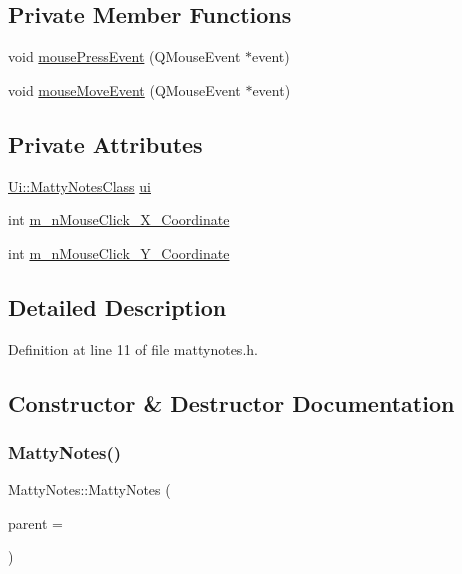 \subsection*{Private Member Functions}
\begin{DoxyCompactItemize}
\item 
void \hyperlink{classMattyNotes_a4818a8cc2dbd824bc005034cb2656198}{mouse\+Press\+Event} (Q\+Mouse\+Event $\ast$event)
\item 
void \hyperlink{classMattyNotes_a0b9d1b50929a097d705e211b57fb12d0}{mouse\+Move\+Event} (Q\+Mouse\+Event $\ast$event)
\end{DoxyCompactItemize}
\subsection*{Private Attributes}
\begin{DoxyCompactItemize}
\item 
\hyperlink{classUi_1_1MattyNotesClass}{Ui\+::\+Matty\+Notes\+Class} \hyperlink{classMattyNotes_aa697392317715f04e4bc011090bebdb5}{ui}
\item 
int \hyperlink{classMattyNotes_a9c2352149386cb95946e3a8526c1ad2c}{m\+\_\+n\+Mouse\+Click\+\_\+\+X\+\_\+\+Coordinate}
\item 
int \hyperlink{classMattyNotes_aa4b9e6a5553ad49e4389340a783a85b9}{m\+\_\+n\+Mouse\+Click\+\_\+\+Y\+\_\+\+Coordinate}
\end{DoxyCompactItemize}


\subsection{Detailed Description}


Definition at line 11 of file mattynotes.\+h.



\subsection{Constructor \& Destructor Documentation}
\hypertarget{classMattyNotes_aa81db851f82183700abb0b7cd1ba2299}{}\label{classMattyNotes_aa81db851f82183700abb0b7cd1ba2299} 
\subsubsection{\texorpdfstring{Matty\+Notes()}{MattyNotes()}}
{\footnotesize\ttfamily Matty\+Notes\+::\+Matty\+Notes (\begin{DoxyParamCaption}\item[{Q\+Widget $\ast$}]{parent = {} }\end{DoxyParamCaption})}



